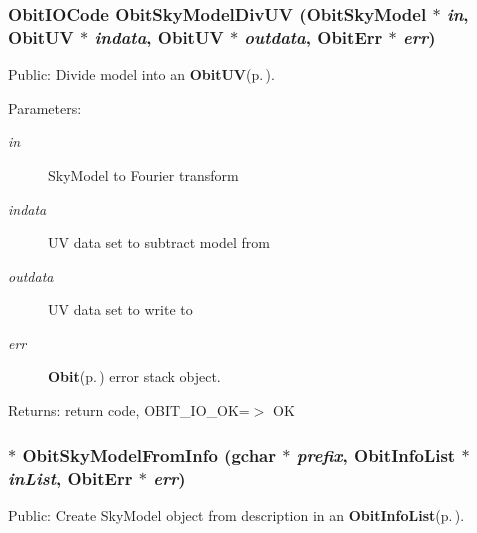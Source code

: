 \subsubsection{\setlength{\rightskip}{0pt plus 5cm}Obit\-IOCode Obit\-Sky\-Model\-Div\-UV ({\bf Obit\-Sky\-Model} $\ast$ {\em in}, {\bf Obit\-UV} $\ast$ {\em indata}, {\bf Obit\-UV} $\ast$ {\em outdata}, {\bf Obit\-Err} $\ast$ {\em err})}\label{ObitSkyModel_8h_a58}


Public: Divide model into an {\bf Obit\-UV}{\rm (p.\,\pageref{structObitUV})}. 

\begin{Desc}
\item[Parameters:]
\begin{description}
\item[{\em in}]Sky\-Model to Fourier transform \item[{\em indata}]UV data set to subtract model from \item[{\em outdata}]UV data set to write to \item[{\em err}]{\bf Obit}{\rm (p.\,\pageref{structObit})} error stack object. \end{description}
\end{Desc}
\begin{Desc}
\item[Returns:]return code, OBIT\_\-IO\_\-OK=$>$ OK \end{Desc}
\subsubsection{$\ast$ Obit\-Sky\-Model\-From\-Info (gchar $\ast$ {\em prefix}, {\bf Obit\-Info\-List} $\ast$ {\em in\-List}, {\bf Obit\-Err} $\ast$ {\em err})}\label{ObitSkyModel_8h_a49}


Public: Create Sky\-Model object from description in an {\bf Obit\-Info\-List}{\rm (p.\,\pageref{structObitInfoList})}. 

